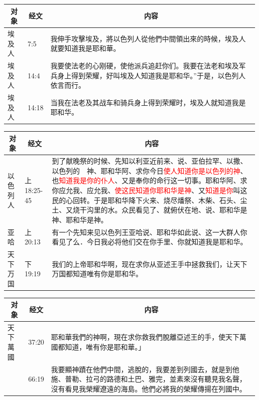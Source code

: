 \begin{table}[H]
\centering
\begin{tabular}{p{1.5cm}|p{}|p{13.0cm}}\hline\hline
\multicolumn{1}{c|}{对象}&\multicolumn{1}{c|}{经文}&\multicolumn{1}{c}{内容}\\\hline
埃及人&7:5&我伸手攻擊埃及，將以色列人從他們中間領出來的時候，埃及人就要知道我是耶和華。\\\hline
埃及人&14:4&我要使法老的心刚硬，使他派兵追赶你们。我要在法老和埃及军兵身上得到荣耀，好叫埃及人知道我是耶和华。”于是，以色列人依言而行。\\\hline
埃及人&14:18&当我在法老及其战车和骑兵身上得到荣耀时，埃及人就知道我是耶和华。\\\hline 
\end{tabular}
\end{table}


\begin{table}[H]
\centering
\begin{tabular}{p{1.5cm}|p{}|p{13.0cm}}\hline\hline
\multicolumn{1}{c|}{对象}&\multicolumn{1}{c|}{经文}&\multicolumn{1}{c}{内容}\\\hline
以色列人&上18:25-45&到了献晚祭的时候、先知以利亚近前来、说、亚伯拉罕、以撒、以色列的　神、耶和华阿、求你今日\textcolor{red}{使人知道你是以色列的神}、也\textcolor{red}{知道我是你的仆人}、又是奉你的命行这一切事。耶和华阿、求你应允我、应允我、\textcolor{red}{使这民知道你耶和华是神}、又\textcolor{red}{知道是你}叫这民的心回转。于是耶和华降下火来、烧尽燔祭、木柴、石头、尘土、又烧干沟里的水。众民看见了、就俯伏在地、说、耶和华是神、耶和华是神。\\\hline

亚哈&上 20:13&有一个先知来见以色列王亚哈说、耶和华如此说、这一大群人你看见了么．今日我必将他们交在你手里、你就知道我是耶和华。\\\hline 
天下万国&下19:19&我们的上帝耶和华啊，现在求你从亚述王手中拯救我们，让天下万国都知道唯有你是耶和华。\\\hline
\end{tabular}
\end{table}





\begin{table}[H]
\centering
\begin{tabular}{p{1.5cm}|p{}|p{13.0cm}}\hline\hline
\multicolumn{1}{c|}{对象}&\multicolumn{1}{c|}{经文}&\multicolumn{1}{c}{内容}\\\hline
天下萬國&37:20&耶和華我們的神啊，現在求你救我們脫離亞述王的手，使天下萬國都知道，唯有你是耶和華。」\\\hline 
&66:19&我要顯神蹟在他們中間，逃脫的，我要差到列國去，就是到他施、普勒、拉弓的路德和土巴、雅完，並素來沒有聽見我名聲，沒有看見我榮耀遼遠的海島。他們必將我的榮耀傳揚在列國中。\\\hline 
\end{tabular}
\end{table}

